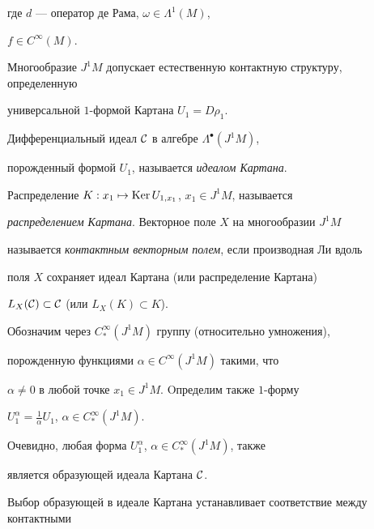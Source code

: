 где $d$ --- оператор де Рама, $\omega \in \Lambda^1(M)$,


$f\in C^\infty (M)$.





\begin{prop}


Многообразие $J^1M$ допускает естественную контактную структуру, определенную 


универсальной $1$-формой Картана $U_1=D\rho_1$.


\end{prop}





\begin{defn}


Дифференциальный идеал $\cal C$ в алгебре $\Lambda^{\bullet}(J^1M)$,


порожденный формой $U_1$, называется {\em идеалом Картана}.


Распределение $K:x_1\mapsto \operatorname{Ker} U_{1,x_1}$, $x_1\in J^1M$, называется


{\em распределением Картана}. Векторное поле $X$ на многообразии $J^1M$ 


называется {\em контактным векторным полем}, если производная Ли вдоль 


поля $X$ сохраняет идеал Картана (или распределение Картана) 


$L_X(\cal C)\subset \cal C$ (или $L_X(K)\subset K$). 


\end{defn}





Обозначим через $C_*^\infty (J^1M)$ группу (относительно умножения), 


порожденную функциями $\alpha \in C^\infty (J^1M)$ такими, что 


$\alpha \ne 0$ в любой точке $x_1\in J^1M$. Oпределим также $1$-форму


$U_1^\alpha =\frac 1\alpha U_1$, $\alpha \in C_{*}^\infty (J^1M)$.





Очевидно, любая форма $U_1^\alpha$, $\alpha\in C^\infty_*(J^1M)$, также 


является образующей идеала Картана ${\cal C}$.


Выбор образующей в идеале Картана устанавливает соответствие между контактными


